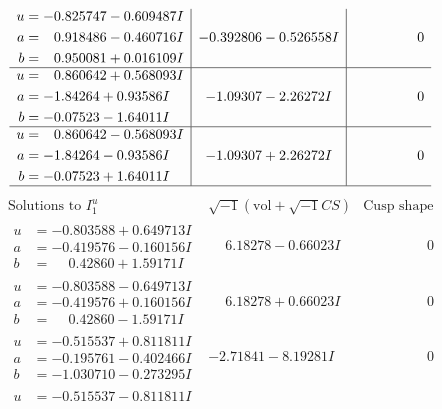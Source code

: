 \documentclass[1p]{elsarticle_modified}
\theoremstyle{definition}
\newcommand{\I}{\sqrt{-1}}
\begin{document}
$$\begin{array}{c|c|c}
\begin{aligned}
u &= -0.825747 - 0.609487 I \\
a &= \phantom{-}0.918486 - 0.460716 I \\
b &= \phantom{-}0.950081 + 0.016109 I\end{aligned}
 & -0.392806 - 0.526558 I & \phantom{-0.000000 } 0 \\ \hline\begin{aligned}
u &= \phantom{-}0.860642 + 0.568093 I \\
a &= -1.84264 + 0.93586 I \\
b &= -0.07523 - 1.64011 I\end{aligned}
 & -1.09307 - 2.26272 I & \phantom{-0.000000 } 0 \\ \hline\begin{aligned}
u &= \phantom{-}0.860642 - 0.568093 I \\
a &= -1.84264 - 0.93586 I \\
b &= -0.07523 + 1.64011 I\end{aligned}
 & -1.09307 + 2.26272 I & \phantom{-0.000000 } 0\\
 \hline 
 \end{array}$$\newpage$$\begin{array}{c|c|c}  
\text{Solutions to }I^u_{1}& \I (\text{vol} + \sqrt{-1}CS) & \text{Cusp shape}\\
 \hline 
\begin{aligned}
u &= -0.803588 + 0.649713 I \\
a &= -0.419576 - 0.160156 I \\
b &= \phantom{-}0.42860 + 1.59171 I\end{aligned}
 & \phantom{-}6.18278 - 0.66023 I & \phantom{-0.000000 } 0 \\ \hline\begin{aligned}
u &= -0.803588 - 0.649713 I \\
a &= -0.419576 + 0.160156 I \\
b &= \phantom{-}0.42860 - 1.59171 I\end{aligned}
 & \phantom{-}6.18278 + 0.66023 I & \phantom{-0.000000 } 0 \\ \hline\begin{aligned}
u &= -0.515537 + 0.811811 I \\
a &= -0.195761 - 0.402466 I \\
b &= -1.030710 - 0.273295 I\end{aligned}
 & -2.71841 - 8.19281 I & \phantom{-0.000000 } 0 \\ \hline\begin{aligned}
u &= -0.515537 - 0.811811 I \\

\end{aligned}
\end{array}$$
\end{document}
